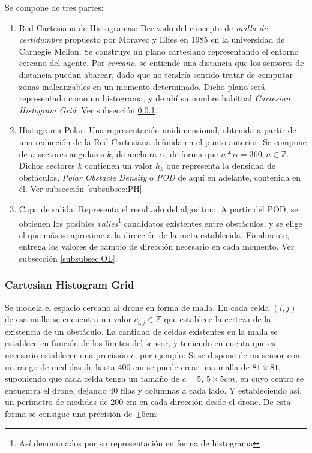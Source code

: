 Se compone de tres partes: 
\begin{enumerate}
\item Red Cartesiana de Histogramas: Derivado del concepto de \textit{malla de certidumbre} propuesto por Moravec y Elfes en 1985 \citep{conf:CertainityGrid}  en la universidad de Carnegie Mellon. Se construye un plano cartesiano representando el entorno cercano del agente. Por \textit{cercano}, se entiende una distancia que los sensores de distancia puedan abarcar, dado que no tendría sentido tratar de computar zonas inalcanzables en un momento determinado. Dicho plano será representado como un histograma, y de ahí su nombre habitual \textit{Cartesian Histogram Grid}. Ver subsección \ref{subsubsec:CHG}.
\item Histograma Polar: Una representación unidimensional, obtenida a partir de una reducción de la Red Cartesiana definida en el punto anterior. Se compone de $n$ sectores angulares $k$, de anchura $\alpha$, de forma que $n * \alpha = 360; n \in \mathbb{Z}$. Dichos sectores $k$ contienen un valor $h_k$ que representa la densidad de obstáculos, \textit{Polar Obstacle Density} o \textit{POD} de aquí en adelante, contenida en él. Ver subsección \ref{subsubsec:PH}.
\item Capa de salida: Representa el resultado del algoritmo. A partir del POD, se obtienen los posibles \textit{valles}\footnote{Así denominados por su representación en forma de histograma} candidatos existentes entre obstáculos, y se elige el que más se aproxime a la dirección de la meta establecida. Finalmente, entrega los valores de cambio de dirección necesario en cada momento. Ver subsección \ref{subsubsec:OL}.
\end{enumerate}

\subsubsection{Cartesian Histogram Grid}
\label{subsubsec:CHG}
Se modela el espacio cercano al drone en forma de malla. En cada celda $(i,j)$ de esa malla se encuentra un valor $c_{i,j} \in \mathbb{Z}$ que establece la certeza de la existencia de un obstáculo. La cantidad de celdas existentes en la malla se establece en función de los límites del sensor, y teniendo en cuenta que es necesario establecer una precisión $c$, por ejemplo: Si se dispone de un sensor con un rango de medidas de hasta 400 cm se puede crear una malla de $81\times 81$, suponiendo que cada celda tenga un tamaño de $c=5$, $5 \times 5cm$, en cuyo centro se encuentra el drone, dejando 40 filas y columnas a cada lado. Y estableciendo así, un perímetro de medidas de 200 cm en cada dirección desde el drone. De esta forma se consigue una precisión de $\pm5\text{cm}$

